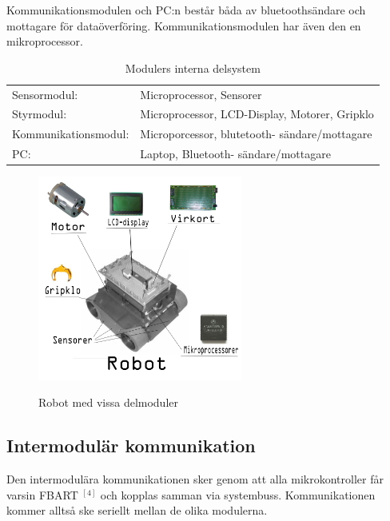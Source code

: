 \documentclass[11pt]{article}
\begin{document}
\begin{flushleft}
\bigskip

Kommunikationsmodulen och PC:n består båda av bluetoothsändare och mottagare för dataöverföring. Kommunikationsmodulen har även den en mikroprocessor.

\bigskip

\begin{table}[ht]

\centering
\begin{tabular}{l l}
Sensormodul:&
Microprocessor, Sensorer \\

Styrmodul:&
Microprocessor, LCD-Display, Motorer, Gripklo\\

Kommunikationsmodul:&
Microporcessor, blutetooth- sändare/mottagare  \\

PC:&
Laptop, Bluetooth- sändare/mottagare \\
\end{tabular}
\caption{Modulers interna delsystem}
\label{tab:Delmoduler}
\end{table}

\begin{figure}[H]
\centering
\caption{Robot med vissa delmoduler}
\includegraphics[width=0.6\textwidth]{Robot_moduler}
\label{figure:robot}
\end{figure}

\subsection{Intermodulär kommunikation}
Den intermodulära kommunikationen sker genom att alla mikrokontroller får varsin FBART $^{[4]}$ och kopplas samman via systembuss. Kommunikationen kommer alltså ske seriellt mellan de olika modulerna.





\end{flushleft}
\end{document}
